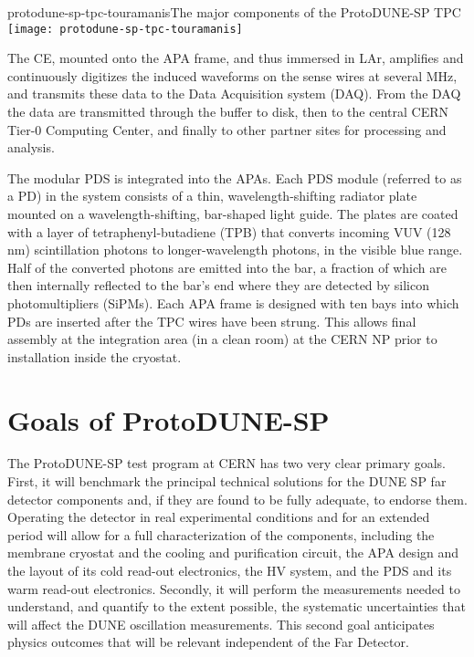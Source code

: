 \begin{cdrfigure}{protodune-sp-tpc-touramanis}{The major components of the ProtoDUNE-SP TPC}
\texttt{[image: protodune-sp-tpc-touramanis]}
\end{cdrfigure}

The CE, mounted onto the APA frame, and thus immersed in LAr, amplifies and continuously digitizes the induced waveforms on the sense wires at several MHz, and transmits these data to the Data Acquisition system (DAQ). From the DAQ the data are  transmitted through the buffer to disk, then to the central CERN Tier-0 Computing Center, and finally to other partner sites for processing and analysis.  

The modular PDS is integrated into the APAs. Each PDS module (referred to as a PD) in the system consists of a thin, wavelength-shifting radiator plate mounted on a wavelength-shifting, bar-shaped light guide. The plates are coated with a
layer of tetraphenyl-butadiene (TPB) that converts incoming VUV (128 nm) 
scintillation photons to longer-wavelength photons, in the visible blue range. Half of the converted photons are emitted into the bar, a fraction of which are then internally reflected to the bar's end where they are detected by silicon photomultipliers (SiPMs).
Each APA frame is designed with ten bays into which PDs are inserted after the TPC wires have been strung. This  allows final assembly at the integration area (in a clean room) at the CERN NP prior to installation inside the cryostat. 


\section{Goals of ProtoDUNE-SP}
\label{intro:goals}

The ProtoDUNE-SP test program at CERN has two very clear primary goals. First, it will benchmark the principal technical solutions for the DUNE SP far detector components and, if they are found to be fully adequate, to endorse them. 
Operating the detector in real experimental conditions and for an extended period will allow for a full characterization of the components, including the membrane cryostat and the cooling and purification circuit, the APA design and the layout of its cold read-out electronics, the HV system, and the PDS and its warm read-out electronics.
%
Secondly, it will perform the measurements needed to understand, and quantify to the extent possible, the systematic uncertainties that will affect the DUNE oscillation measurements. This second goal anticipates physics outcomes that will be relevant independent of the Far Detector.

